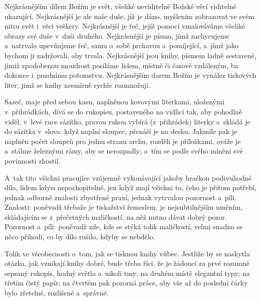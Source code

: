 Nejkrásnějším dílem Božím je svět, všeliké neviditelné Božské věcí viditelné
ukazující. Nejkrásnější je ale naše duše, jíž je dáno, myšlením zobrazovat ve
svém nitru svět i~věci veškery. Nejkrásnější je řeč, jejíž pomocí vmalováváme
všeliké obrazy své duše v~duši druhého. Nejkrásnější je písmo, jímž zachycujeme
a~natrvalo upevňujeme řeč, samu o~sobě prchavou a~pomíjející, a~jímž jako bychom
ji zadržovali, aby trvala. Nejkrásnější jsou knihy, písmem ladně sestavené, jimiž
zpodobenou moudrost posíláme lidem, místně či časově vzdáleným, ba dokonce
i~pozdnímu potomstvu. Nejkrásnějším darem Božím je vynález tiskových liter, jimž
se knihy nesmírně rychle rozmnožují.

Sazeč, maje před sebou kasu, naplněnou kovovými literkami, uloženými
v~přihrádkách, dívá se do rukopisu, postaveného na vidlici tak, aby pohodlně
viděl, v~levé ruce sázítko, pravou rukou vybírá (z~přihrádek) literky a~skládá je
do sázítka v~slova: když naplní sloupec, přenáší je na desku. Jakmile pak je
naplněn počet sloupců pro jednu stranu archu, rozdělí je příložkami, ováže je
a~stáhne železnými rámy, aby se nerozpadly; a~tím se podle svého mínění své
povinnosti zhostil.

A~tak tito všichni pracujíce vzájemně vykonávající jakoby hračkou podivuhodné
dílo, lidem kdysi nepochopitelné, jen když mají všichni to, čeho je přitom
potřebí, jednak odborné znalosti zbystřené praxí, jednak vytrvalou pozornost
a~píli. Znalosti: poněvadž třebaže je tiskařství řemeslem, je nejsubtilnějším
uměním, skládajícím se z~přečetných maličkostí, na něž nutno dávat dobrý pozor.
Pozornost a~píli: poněvadž zde, kde se stýká tolik maličkostí, velmi snadno se
něco přihodí, co by dílo rušilo, kdyby se nebdělo.

Tolik ve všeobecnosti o~tom, jak se tisknou knihy vůbec. Jestliže by se naskytla
otázka, jak vznikají knihy dobré, bude třeba říci, že je žádoucí za prvé rozumně
sepsaný rukopis, hodný světla a~nikoli tmy; na druhém místě elegantní typy; na
třetím čistý papír; na čtvrtém pak pozorná práce, aby vše až do poslední čárky
bylo zřetelné, rozlišené a~správné.
